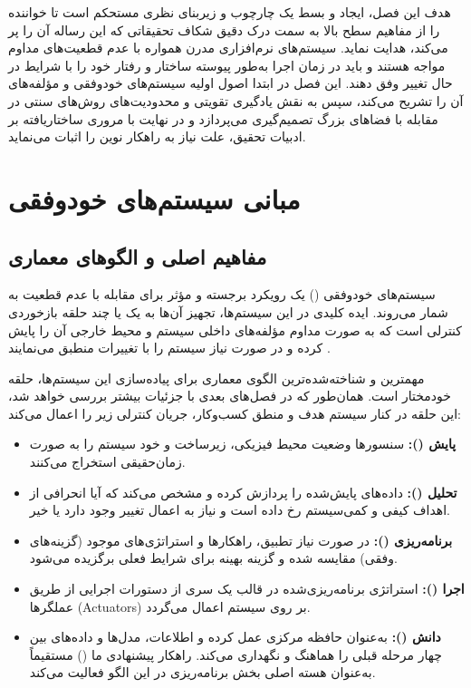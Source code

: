 \documentclass[oneside,openany,phd]{TMU-Thesis}
\begin{document}
هدف این فصل، ایجاد و بسط یک چارچوب و زیربنای نظری مستحکم است تا خواننده را از مفاهیم سطح بالا به سمت درک دقیق شکاف تحقیقاتی که این رساله آن را پر می‌کند، هدایت نماید. سیستم‌های نرم‌افزاری مدرن همواره با عدم قطعیت‌های مداوم مواجه هستند و باید در زمان اجرا به‌طور پیوسته ساختار و رفتار خود را با شرایط در حال تغییر وفق دهند. این فصل در ابتدا اصول اولیه سیستم‌های خودوفقی و مؤلفه‌های آن را تشریح می‌کند، سپس به نقش یادگیری تقویتی و محدودیت‌های روش‌های سنتی در مقابله با فضاهای بزرگ تصمیم‌گیری می‌پردازد و در نهایت با مروری ساختاریافته بر ادبیات تحقیق، علت نیاز به راهکار نوین  را اثبات می‌نماید.

\section{مبانی سیستم‌های خودوفقی}
\subsection{مفاهیم اصلی و الگوهای معماری}

سیستم‌های خودوفقی () یک رویکرد برجسته و مؤثر برای مقابله با عدم قطعیت به شمار می‌روند. ایده کلیدی در این سیستم‌ها، تجهیز آن‌ها به یک یا چند حلقه بازخوردی کنترلی است که به صورت مداوم مؤلفه‌های داخلی سیستم و محیط خارجی آن را پایش کرده و در صورت نیاز سیستم را با تغییرات منطبق می‌نمایند \cite{RS_DRL_Article}. 

مهمترین و شناخته‌شده‌ترین الگوی معماری برای پیاده‌سازی این سیستم‌ها، حلقه خودمختار  است. همان‌طور که در فصل‌های بعدی با جزئیات بیشتر بررسی خواهد شد، این حلقه در کنار سیستم هدف و منطق کسب‌وکار، جریان کنترلی زیر را اعمال می‌کند:
\begin{itemize}
    \item \textbf{پایش ():} سنسورها وضعیت محیط فیزیکی، زیرساخت و خود سیستم را به صورت زمان‌حقیقی استخراج می‌کنند.
    \item \textbf{تحلیل ():} داده‌های پایش‌شده را پردازش کرده و مشخص می‌کند که آیا انحرافی از اهداف کیفی و کمی‌سیستم رخ داده است و نیاز به اعمال تغییر وجود دارد یا خیر.
    \item \textbf{برنامه‌ریزی ():} در صورت نیاز تطبیق، راهکارها و استراتژی‌های موجود (گزینه‌های وفقی) مقایسه شده و گزینه بهینه برای شرایط فعلی برگزیده می‌شود.
    \item \textbf{اجرا ():} استراتژی برنامه‌ریزی‌شده در قالب یک سری از دستورات اجرایی از طریق عملگرها (Actuators) بر روی سیستم اعمال می‌گردد.
    \item \textbf{دانش ():} به‌عنوان حافظه مرکزی عمل کرده و اطلاعات، مدل‌ها و داده‌های بین چهار مرحله قبلی را هماهنگ و نگهداری می‌کند. راهکار پیشنهادی ما () مستقیماً به‌عنوان هسته اصلی بخش برنامه‌ریزی در این الگو فعالیت می‌کند.
\end{itemize}
\end{document}
